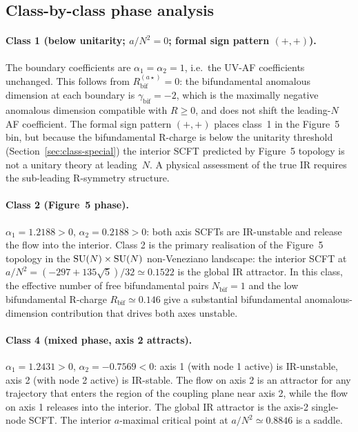 



\subsection{Class-by-class phase analysis}
\label{sec:phases-each}

\paragraph{Class 1 (below unitarity; $a/N^{2}=0$; formal sign pattern $(+,+)$).}
The boundary coefficients are $\alpha_{1}=\alpha_{2}=1$, i.e.\ the
UV-AF coefficients unchanged.  This follows from
$R_{\text{bif}}^{(a\star)}=0$: the bifundamental anomalous
dimension at each boundary is $\gamma_{\text{bif}}=-2$, which is the
maximally negative anomalous dimension compatible with $R\ge 0$, and
does not shift the leading-$N$ AF coefficient.  The formal sign
pattern $(+,+)$ places class~1 in the Figure~5 bin, but because the
bifundamental R-charge is below the unitarity threshold
(Section~\ref{sec:class-special}) the interior SCFT predicted by
Figure~5 topology is not a unitary theory at leading~$N$.  A physical
assessment of the true IR requires the sub-leading R-symmetry
structure.

\paragraph{Class 2 (Figure~5 phase).}
$\alpha_{1}=1.2188>0$, $\alpha_{2}=0.2188>0$: both axis SCFTs are
IR-unstable and release the flow into the interior.  Class 2 is the
primary realisation of the Figure~5 topology in the
$\mathrm{SU}(N)\times\mathrm{SU}(N)$ non-Veneziano landscape: the interior SCFT at
$a/N^{2}=(-297+135\sqrt 5)/32\simeq 0.1522$ is the global IR
attractor.  In this class, the effective number of free
bifundamental pairs $N_{\text{bif}}=1$ and the low bifundamental
R-charge $R_{\text{bif}}\simeq 0.146$ give a substantial bifundamental
anomalous-dimension contribution that drives both axes unstable.

\paragraph{Class 4 (mixed phase, axis 2 attracts).}
$\alpha_{1}=1.2431>0$, $\alpha_{2}=-0.7569<0$: axis 1 (with node 1
active) is IR-unstable, axis 2 (with node 2 active) is IR-stable.
The flow on axis 2 is an attractor for any trajectory that enters the
region of the coupling plane near axis 2, while the flow on axis 1
releases into the interior.  The global IR attractor is the axis-2
single-node SCFT.  The interior $a$-maximal critical point at
$a/N^{2}\simeq 0.8846$ is a saddle.

